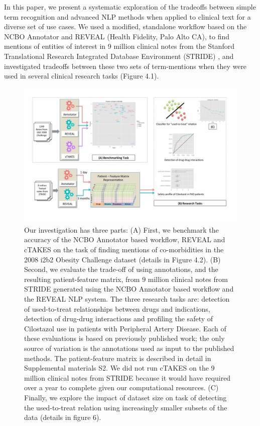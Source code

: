 In this paper, we present a systematic exploration of the tradeoffs
between simple term recognition and advanced NLP methods when applied
to clinical text for a diverse set of use cases.  We used a modified,
standalone workflow based on the NCBO Annotator
\cite{Noy2009,Lependu2012b,Jonquet2010} and REVEAL (Health Fidelity,
Palo Alto CA), to find mentions of entities of interest in 9 million
clinical notes from the Stanford Translational Research Integrated
Database Environment (STRIDE) \cite{Lowe2009}, and investigated
tradeoffs between these two sets of term-mentions when they were used
in several clinical research tasks (Figure 4.1).

\begin{figure}
  \begin{center}
    \includegraphics[width=0.9\linewidth]{ch4-figures/Figure1.pdf}
  \end{center}
  \caption[Overview of text processing tool comparison]{Our
    investigation has three parts: (A) First, we benchmark the
    accuracy of the NCBO Annotator based workflow, REVEAL and cTAKES
    on the task of finding mentions of co-morbidities in the 2008 i2b2
    Obesity Challenge dataset (details in Figure 4.2). (B) Second, we
    evaluate the trade-off of using annotations, and the resulting
    patient-feature matrix, from 9 million clinical notes from STRIDE
    generated using the NCBO Annotator based workflow and the REVEAL
    NLP system. The three research tasks are: detection of
    used-to-treat relationships between drugs and indications,
    detection of drug-drug interactions and profiling the safety of
    Cilostazol use in patients with Peripheral Artery Disease. Each of
    these evaluations is based on previously published work; the only
    source of variation is the annotations used as input to the
    published methods. The patient-feature matrix is described in
    detail in Supplemental materials S2. We did not run cTAKES on the
    9 million clinical notes from STRIDE because it would have
    required over a year to complete given our computational
    resources. (C) Finally, we explore the impact of dataset size on
    task of detecting the used-to-treat relation using increasingly
    smaller subsets of the data (details in figure 6).}
  \label{fig:short}
\end{figure}


